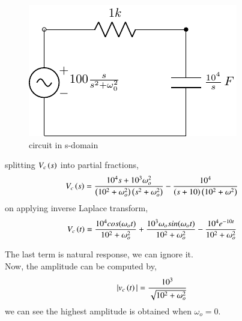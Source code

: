 \documentclass[journal,12pt,twocolumn]{IEEEtran}
\theoremstyle{remark}
\begin{document}
\begin{figure}[h!]
    \includegraphics[width = \columnwidth]{codes/fig2/c_fig2.pdf}
    \caption{circuit in s-domain }
    \centering
    \label{fig: bm_16_fig_2}
\end{figure}
splitting $ V_c\left(s\right)$ into partial fractions,
\begin{align}
V_c\left(s\right) &= \frac{10^4s+10^3\omega_o^2}{\left(10^2+\omega_o^2\right)\left(s^2+\omega_o^2\right)}-\frac{10^4}{\left(s+10\right)\left(10^2+\omega^2\right)}
\end{align}
on applying inverse Laplace transform,
\begin{align}
V_c\left(t\right)&= \frac{10^4cos(\omega_o t)}{10^2+\omega_o^2}+\frac{10^3\omega_osin(\omega_o t)}{10^2+\omega_o^2}-\frac{10^4e^{-10t}}{10^2+\omega_o^2}
\end{align}

\vspace{5cm}
The last term is natural response, we can ignore it.\\
Now, the amplitude can be computed by,
\begin{align}
|v_c\left(t\right)| &= \frac{10^3}{\sqrt{10^2+\omega_o^2}}
\end{align}
we can see the highest amplitude is obtained when $ \omega_o = 0$.
\end{document}
